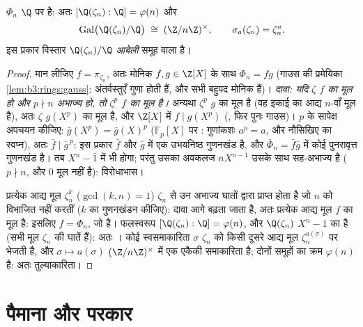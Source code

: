 \begin{theorem}\label{thm:b3:galois:cyclotomicirred}
$\Phi_n$ $\Q$ पर  है; अतः $[\Q(\zeta_n) : \Q] =
\varphi(n)$ और
\[
\operatorname{Gal}\bigl(\Q(\zeta_n)/\Q\bigr) \;\cong\;
(\Z/n\Z)^\times,
\qquad \sigma_a(\zeta_n) = \zeta_n^a .
\]
इस प्रकार विस्तार $\Q(\zeta_n)/\Q$ \emph{आबेली} समूह वाला 
है।
\end{theorem}

\begin{proof}
मान लीजिए $f = \pi_{\zeta_n}$, अतः मोनिक $f, g \in \Z[X]$ के साथ $\Phi_n = fg$ (गाउस की प्रमेयिका
\cref{lem:b3:rings:gauss}: अंतर्वस्तुएँ गुणा होती हैं, और सभी बहुपद मोनिक हैं)।
\emph{दावा: यदि $\zeta$ $f$ का मूल हो और $p \nmid n$ अभाज्य हो, तो
$\zeta^p$ $f$ का मूल है।} अन्यथा $\zeta^p$ $g$ का मूल है (वह इकाई
का आद्य $n$-वाँ मूल है), अतः $\zeta$ $g(X^p)$ का मूल है, और $\Z[X]$
में $f
\mid g(X^p)$ (, फिर पुनः गाउस)। $p$ के सापेक्ष अपचयन
कीजिए: $\bar g(X^p) = \bar g(X)^p$ ($\mathbb F_p[X]$ पर : गुणांकशः $a^p = a$, और नौसिखिए का
स्वप्न), अतः $\bar f \mid \bar g^{\,p}$: इस प्रकार $\bar f$ और $\bar g$ में एक उभयनिष्ठ
 गुणनखंड है, और $\bar\Phi_n = \bar f\bar g$ में कोई पुनरावृत्त गुणनखंड है। तब
$X^n - \bar 1$ में भी होगा; परंतु उसका अवकलज $\bar nX^{n-1}$ उसके साथ सह-अभाज्य है
($p \nmid n$, और $0$ मूल नहीं है): विरोधाभास।

प्रत्येक आद्य मूल $\zeta_n^k$ ($\gcd(k, n) = 1$) $\zeta_n$ से उन अभाज्य घातों द्वारा
प्राप्त होता है जो $n$ को विभाजित नहीं करतीं ($k$ का
गुणनखंडन कीजिए): दावा आगे बढ़ता जाता है, अतः प्रत्येक आद्य मूल
$f$ का मूल है: इसलिए $f = \Phi_n$, जो  है। फलस्वरूप $[\Q(\zeta_n):\Q] = \varphi(n)$, और
$\Q(\zeta_n)$  $X^n - 1$ का  है (सभी मूल $\zeta_n$ की घातें
हैं): अतः । कोई स्वसमाकारिता $\sigma$ $\zeta_n$ को किसी दूसरे
आद्य मूल $\zeta_n^{a(\sigma)}$ पर भेजती है, और $\sigma
\mapsto a(\sigma)$ $(\Z/n\Z)^\times$ में एक एकैकी
समाकारिता है; दोनों समूहों का क्रम $\varphi(n)$ है: अतः तुल्याकारिता।
\end{proof}

\section{पैमाना और परकार}

